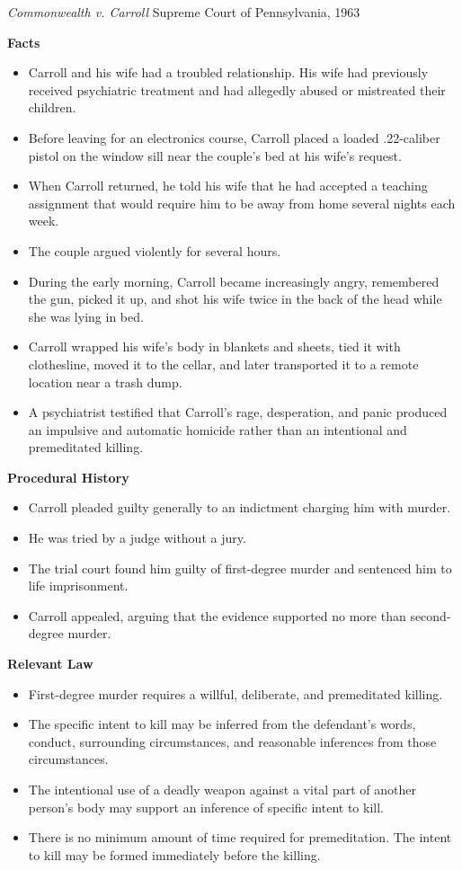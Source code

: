 \documentclass[11pt]{tex/lawoutline}
\begin{document}
\casebox
    {\textit{Commonwealth v. Carroll}}
    {Supreme Court of Pennsylvania, 1963}
    {
        \textbf{Facts}
        \begin{itemize}
            \item Carroll and his wife had a troubled relationship. His wife had previously received psychiatric treatment and had allegedly abused or mistreated their children.
            \item Before leaving for an electronics course, Carroll placed a loaded .22-caliber pistol on the window sill near the couple's bed at his wife's request.
            \item When Carroll returned, he told his wife that he had accepted a teaching assignment that would require him to be away from home several nights each week.
            \item The couple argued violently for several hours.
            \item During the early morning, Carroll became increasingly angry, remembered the gun, picked it up, and shot his wife twice in the back of the head while she was lying in bed.
            \item Carroll wrapped his wife's body in blankets and sheets, tied it with clothesline, moved it to the cellar, and later transported it to a remote location near a trash dump.
            \item A psychiatrist testified that Carroll's rage, desperation, and panic produced an impulsive and automatic homicide rather than an intentional and premeditated killing.
        \end{itemize}

        \textbf{Procedural History}
        \begin{itemize}
            \item Carroll pleaded guilty generally to an indictment charging him with murder.
            \item He was tried by a judge without a jury.
            \item The trial court found him guilty of first-degree murder and sentenced him to life imprisonment.
            \item Carroll appealed, arguing that the evidence supported no more than second-degree murder.
        \end{itemize}

        \textbf{Relevant Law}
        \begin{itemize}
            \item First-degree murder requires a willful, deliberate, and premeditated killing.
            \item The specific intent to kill may be inferred from the defendant's words, conduct, surrounding circumstances, and reasonable inferences from those circumstances.
            \item The intentional use of a deadly weapon against a vital part of another person's body may support an inference of specific intent to kill.
            \item There is no minimum amount of time required for premeditation. The intent to kill may be formed immediately before the killing.
        \end{itemize}

}
\end{document}
